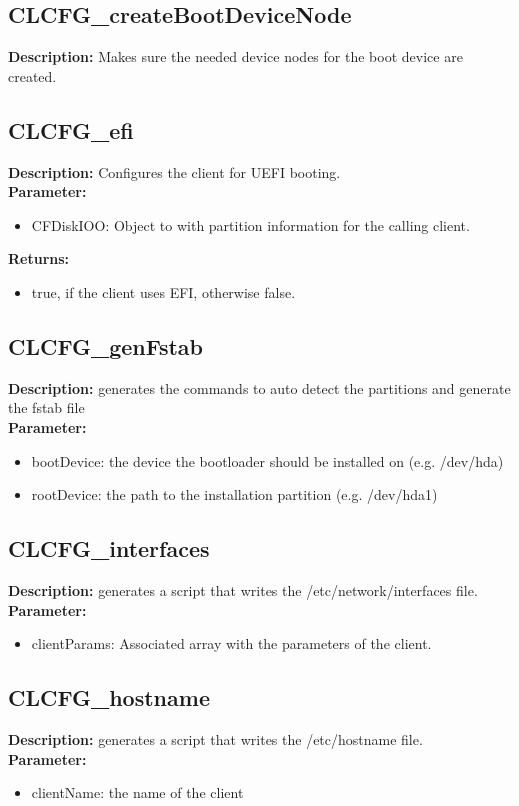 \subsection{CLCFG\_createBootDeviceNode}
\textbf{Description:} Makes sure the needed device nodes for the boot device are created.\\

\subsection{CLCFG\_efi}
\textbf{Description:} Configures the client for UEFI booting.\\
\textbf{Parameter:}
\begin{itemize}
\item CFDiskIOO: Object to with partition information for the calling client.
\end{itemize}
\textbf{Returns:}
\begin{itemize}
\item true, if the client uses EFI, otherwise false.
\end{itemize}

\subsection{CLCFG\_genFstab}
\textbf{Description:} generates the commands to auto detect the partitions and generate the fstab file\\
\textbf{Parameter:}
\begin{itemize}
\item bootDevice: the device the bootloader should be installed on (e.g. /dev/hda)
\item rootDevice: the path to the installation partition (e.g. /dev/hda1)
\end{itemize}

\subsection{CLCFG\_interfaces}
\textbf{Description:} generates a script that writes the /etc/network/interfaces file.\\
\textbf{Parameter:}
\begin{itemize}
\item clientParams: Associated array with the parameters of the client.
\end{itemize}

\subsection{CLCFG\_hostname}
\textbf{Description:} generates a script that writes the /etc/hostname file.\\
\textbf{Parameter:}
\begin{itemize}
\item clientName: the name of the client
\end{itemize}

